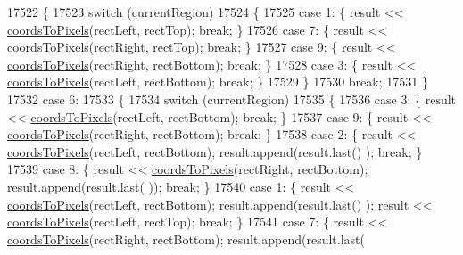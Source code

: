 \begin{DoxyCode}
17522     \{
17523       \textcolor{keywordflow}{switch} (currentRegion)
17524       \{
17525         \textcolor{keywordflow}{case} 1: \{ result << \hyperlink{class_q_c_p_abstract_plottable_ade710a776104b14c1c835168ce1bfc5c}{coordsToPixels}(rectLeft, rectTop); \textcolor{keywordflow}{break}; \}
17526         \textcolor{keywordflow}{case} 7: \{ result << \hyperlink{class_q_c_p_abstract_plottable_ade710a776104b14c1c835168ce1bfc5c}{coordsToPixels}(rectRight, rectTop); \textcolor{keywordflow}{break}; \}
17527         \textcolor{keywordflow}{case} 9: \{ result << \hyperlink{class_q_c_p_abstract_plottable_ade710a776104b14c1c835168ce1bfc5c}{coordsToPixels}(rectRight, rectBottom); \textcolor{keywordflow}{break}; \}
17528         \textcolor{keywordflow}{case} 3: \{ result << \hyperlink{class_q_c_p_abstract_plottable_ade710a776104b14c1c835168ce1bfc5c}{coordsToPixels}(rectLeft, rectBottom); \textcolor{keywordflow}{break}; \}
17529       \}
17530       \textcolor{keywordflow}{break};
17531     \}
17532     \textcolor{keywordflow}{case} 6:
17533     \{
17534       \textcolor{keywordflow}{switch} (currentRegion)
17535       \{
17536         \textcolor{keywordflow}{case} 3: \{ result << \hyperlink{class_q_c_p_abstract_plottable_ade710a776104b14c1c835168ce1bfc5c}{coordsToPixels}(rectLeft, rectBottom); \textcolor{keywordflow}{break}; \}
17537         \textcolor{keywordflow}{case} 9: \{ result << \hyperlink{class_q_c_p_abstract_plottable_ade710a776104b14c1c835168ce1bfc5c}{coordsToPixels}(rectRight, rectBottom); \textcolor{keywordflow}{break}; \}
17538         \textcolor{keywordflow}{case} 2: \{ result << \hyperlink{class_q_c_p_abstract_plottable_ade710a776104b14c1c835168ce1bfc5c}{coordsToPixels}(rectLeft, rectBottom); result.append(result.last()
      ); \textcolor{keywordflow}{break}; \}
17539         \textcolor{keywordflow}{case} 8: \{ result << \hyperlink{class_q_c_p_abstract_plottable_ade710a776104b14c1c835168ce1bfc5c}{coordsToPixels}(rectRight, rectBottom); result.append(result.last(
      )); \textcolor{keywordflow}{break}; \}
17540         \textcolor{keywordflow}{case} 1: \{ result << \hyperlink{class_q_c_p_abstract_plottable_ade710a776104b14c1c835168ce1bfc5c}{coordsToPixels}(rectLeft, rectBottom); result.append(result.last()
      ); result << \hyperlink{class_q_c_p_abstract_plottable_ade710a776104b14c1c835168ce1bfc5c}{coordsToPixels}(rectLeft, rectTop); \textcolor{keywordflow}{break}; \}
17541         \textcolor{keywordflow}{case} 7: \{ result << \hyperlink{class_q_c_p_abstract_plottable_ade710a776104b14c1c835168ce1bfc5c}{coordsToPixels}(rectRight, rectBottom); result.append(result.last(

\end{DoxyCode}
